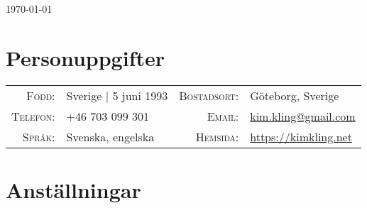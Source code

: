 \documentclass[a4paper,10pt]{scrartcl} %
\begin{document}
\pagestyle{empty} %


\hfill {\small \today}
\par{
	\bigskip\par
}

\section{Personuppgifter}

\begin{tabular}{rp{6cm}rl}
	\textsc{Född:}          & Sverige | 5 juni 1993 &
    \textsc{Bostadsort:}    & Göteborg, Sverige \\
	
	\textsc{Telefon:}       & +46 703 099 301 &
	\textsc{Email:}         & \href{mailto:kim.kling@gmail.com}{kim.kling@gmail.com} \\
	
	\textsc{Språk:}         & Svenska, engelska &
	\textsc{Hemsida:}       & \href{https://kimkling.net}{https://kimkling.net}
\end{tabular}



\section{Anställningar}
\end{document}
